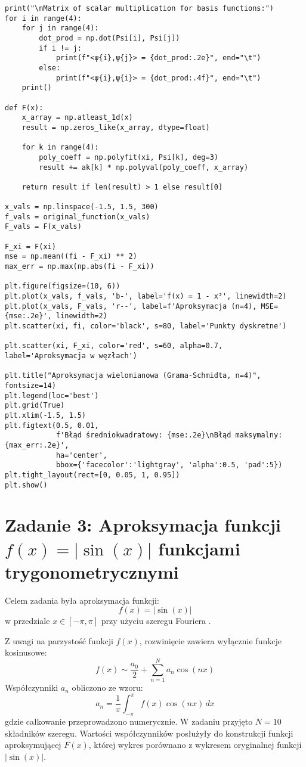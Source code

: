 \documentclass{article}
\begin{document}
\begin{verbatim}
print("\nMatrix of scalar multiplication for basis functions:")
for i in range(4):
    for j in range(4):
        dot_prod = np.dot(Psi[i], Psi[j])
        if i != j:
            print(f"<ψ{i},ψ{j}> = {dot_prod:.2e}", end="\t")
        else:
            print(f"<ψ{i},ψ{i}> = {dot_prod:.4f}", end="\t")
    print()

def F(x):
    x_array = np.atleast_1d(x)
    result = np.zeros_like(x_array, dtype=float)
    
    for k in range(4):
        poly_coeff = np.polyfit(xi, Psi[k], deg=3)
        result += ak[k] * np.polyval(poly_coeff, x_array)
    
    return result if len(result) > 1 else result[0]

x_vals = np.linspace(-1.5, 1.5, 300)
f_vals = original_function(x_vals)
F_vals = F(x_vals)

F_xi = F(xi)
mse = np.mean((fi - F_xi) ** 2)
max_err = np.max(np.abs(fi - F_xi))

plt.figure(figsize=(10, 6))
plt.plot(x_vals, f_vals, 'b-', label='f(x) = 1 - x²', linewidth=2)
plt.plot(x_vals, F_vals, 'r--', label=f'Aproksymacja (n=4), MSE={mse:.2e}', linewidth=2)
plt.scatter(xi, fi, color='black', s=80, label='Punkty dyskretne')

plt.scatter(xi, F_xi, color='red', s=60, alpha=0.7, label='Aproksymacja w węzłach')

plt.title("Aproksymacja wielomianowa (Grama-Schmidta, n=4)", fontsize=14)
plt.legend(loc='best')
plt.grid(True)
plt.xlim(-1.5, 1.5)
plt.figtext(0.5, 0.01, 
            f'Błąd średniokwadratowy: {mse:.2e}\nBłąd maksymalny: {max_err:.2e}', 
            ha='center', 
            bbox={'facecolor':'lightgray', 'alpha':0.5, 'pad':5})
plt.tight_layout(rect=[0, 0.05, 1, 0.95])
plt.show()

\end{verbatim}

\section{Zadanie 3: Aproksymacja funkcji \( f(x) = |\sin(x)| \) funkcjami \\trygonometrycznymi}

Celem zadania była aproksymacja funkcji:
\[
f(x) = |\sin(x)|
\]
w przedziale \( x \in [-\pi, \pi] \) przy użyciu szeregu Fouriera \cite{wiki:Transformacja_Fouriera}.

Z uwagi na parzystość funkcji \( f(x) \), rozwinięcie zawiera wyłącznie funkcje kosinusowe:
\[
f(x) \sim \frac{a_0}{2} + \sum_{n=1}^{N} a_n \cos(n x)
\]
Współczynniki \( a_n \) obliczono ze wzoru:
\[
a_n = \frac{1}{\pi} \int_{-\pi}^{\pi} f(x) \cos(nx) \, dx
\]
gdzie całkowanie przeprowadzono numerycznie. W zadaniu przyjęto \( N = 10 \) składników szeregu. Wartości współczynników posłużyły do konstrukcji funkcji aproksymującej \( F(x) \), której wykres porównano z wykresem oryginalnej funkcji \( |\sin(x)| \).
\end{document}
